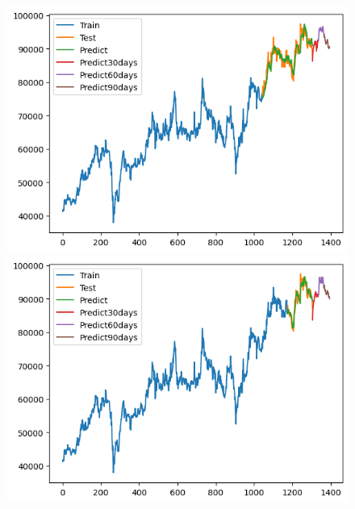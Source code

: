 \begin{figure}[H]
\begin{minipage}{0.15\textwidth}
    \includegraphics[width=1\textwidth]{resources/chapter-5/newdata1/result/VCB_NBeats_8-2.png}
    \end{minipage}
    \hfill
        \begin{minipage}{0.15\textwidth}
    \centering
    \includegraphics[width=1\textwidth]{resources/chapter-5/newdata1/result/VCB_NBeats_9-1.png}
    \end{minipage}
    \hfill
    \begin{minipage}{0.15\textwidth}
    \centering

\end{minipage}
\end{figure}
